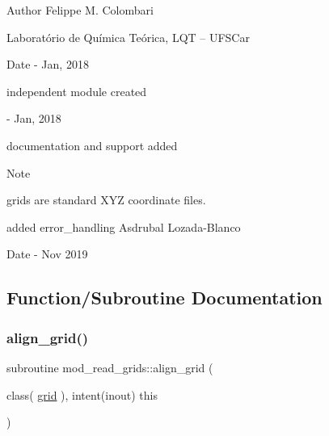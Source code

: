 \begin{DoxyAuthor}{Author}
Felippe M. Colombari
\begin{DoxyItemize}
\item Laboratório de Química Teórica, L\+QT -- U\+F\+S\+Car 
\end{DoxyItemize}
\end{DoxyAuthor}
\begin{DoxyDate}{Date}
-\/ Jan, 2018
\begin{DoxyItemize}
\item independent module created 
\end{DoxyItemize}

-\/ Jan, 2018
\begin{DoxyItemize}
\item documentation and support added 
\end{DoxyItemize}
\end{DoxyDate}
\begin{DoxyNote}{Note}

\begin{DoxyItemize}
\item grids are standard X\+YZ coordinate files. 
\end{DoxyItemize}

added error\+\_\+handling Asdrubal Lozada-\/\+Blanco 
\end{DoxyNote}
\begin{DoxyDate}{Date}
-\/ Nov 2019 
\end{DoxyDate}


\subsection{Function/\+Subroutine Documentation}
\mbox{\label{namespacemod__read__grids_a09768b7e5dbb3769d5babf64f3e9d81e}} 
\subsubsection{\texorpdfstring{align\+\_\+grid()}{align\_grid()}}
{\footnotesize\ttfamily subroutine mod\+\_\+read\+\_\+grids\+::align\+\_\+grid (\begin{DoxyParamCaption}\item[{class( \hyperlink{structmod__read__grids_1_1grid}{grid} ), intent(inout)}]{this }\end{DoxyParamCaption})}



